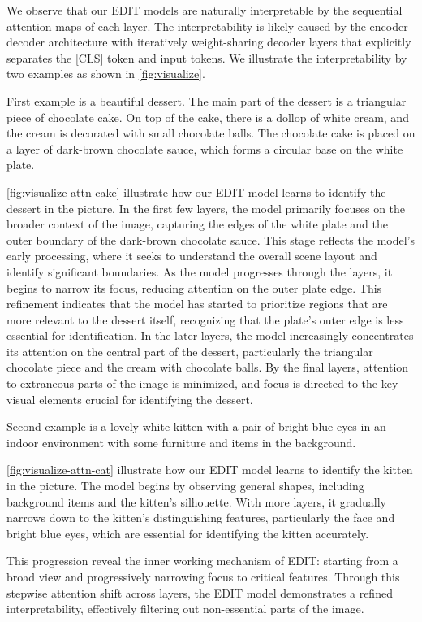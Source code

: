 We observe that our EDIT models are naturally interpretable by the sequential attention maps of each layer.
The interpretability is likely caused by the encoder-decoder architecture with iteratively weight-sharing decoder layers that explicitly separates the [CLS] token and input tokens.
We illustrate the interpretability by two examples as shown in \cref{fig:visualize}.

First example is a beautiful dessert. The main part of the dessert is a triangular piece of chocolate cake. On top of the cake, there is a dollop of white cream, and the cream is decorated with small chocolate balls. The chocolate cake is placed on a layer of dark-brown chocolate sauce, which forms a circular base on the white plate. 

\cref{fig:visualize-attn-cake} illustrate how our EDIT model learns to identify the dessert in the picture.
In the first few layers, the model primarily focuses on the broader context of the image, capturing the edges of the white plate and the outer boundary of the dark-brown chocolate sauce. This stage reflects the model’s early processing, where it seeks to understand the overall scene layout and identify significant boundaries.
As the model progresses through the layers, it begins to narrow its focus, reducing attention on the outer plate edge. This refinement indicates that the model has started to prioritize regions that are more relevant to the dessert itself, recognizing that the plate’s outer edge is less essential for identification.
In the later layers, the model increasingly concentrates its attention on the central part of the dessert, particularly the triangular chocolate piece and the cream with chocolate balls. By the final layers, attention to extraneous parts of the image is minimized, and focus is directed to the key visual elements crucial for identifying the dessert.

Second example is a lovely white kitten with a pair of bright blue eyes in an indoor environment with some furniture and items in the background.

\cref{fig:visualize-attn-cat} illustrate how our EDIT model learns to identify the kitten in the picture.
The model begins by observing general shapes, including background items and the kitten’s silhouette. With more layers, it gradually narrows down to the kitten’s distinguishing features, particularly the face and bright blue eyes, which are essential for identifying the kitten accurately.

This progression reveal the inner working mechanism of EDIT: starting from a broad view and progressively narrowing focus to critical features. 
Through this stepwise attention shift across layers, the EDIT model demonstrates a refined interpretability, effectively filtering out non-essential parts of the image.


